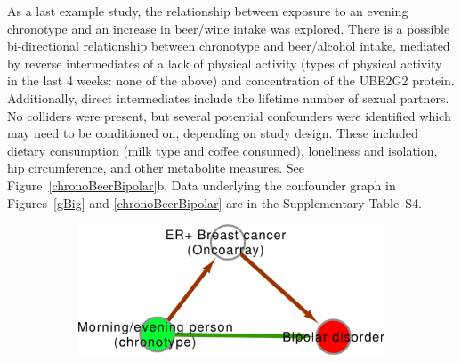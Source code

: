 \documentclass[genes,article,accept,moreauthors,pdftex]{Definitions/mdpi}
\begin{document}
\begin{paracol}{2}
\switchcolumn






As a last example study, the relationship between exposure to an evening chronotype and an increase in beer/wine intake was explored. There is a possible bi-directional relationship between chronotype and beer/alcohol intake, mediated by reverse intermediates of a lack of physical activity (types of physical activity in the last 4 weeks: none of the above) and concentration of the UBE2G2 protein. Additionally, direct intermediates include the lifetime number of sexual partners. No colliders were present, but several potential confounders were identified which may need to be conditioned on, depending on study design. These included dietary consumption (milk type and coffee consumed), loneliness and isolation, hip circumference, and other metabolite measures. See Figure~\ref{chronoBeerBipolar}b. Data underlying the confounder graph in Figures~\ref{gBig} and \ref{chronoBeerBipolar} are in the Supplementary { \mbox{Table S4}}.
\begin{figure}[H]
{\captionsetup{position=bottom,justification=centering}
\begin{subfigure}{.35\linewidth}
	\includegraphics[width=\linewidth]{Figs/Analysis3/new_chrono_bipolar.pdf}
\caption{}
\label{chronoBipolar}
\end{subfigure}
\begin{subfigure}{.65\linewidth}

\end{subfigure}}
\end{figure}
\end{paracol}
\end{document}
